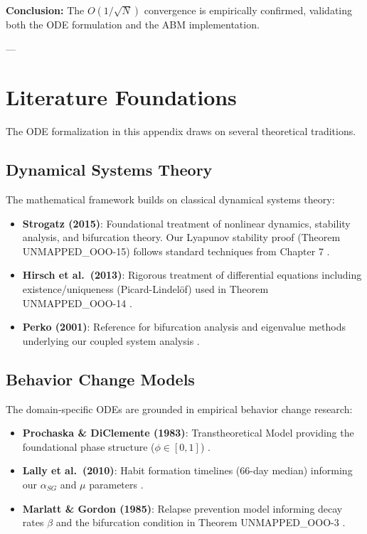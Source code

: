 \textbf{Conclusion:} The $O(1/\sqrt{N})$ convergence is empirically confirmed,
validating both the ODE formulation and the ABM implementation.

---


\section{Literature Foundations}
\label{ooo:literature}

The ODE formalization in this appendix draws on several theoretical traditions.

\subsection{Dynamical Systems Theory}

The mathematical framework builds on classical dynamical systems theory:

\begin{itemize}
\item \textbf{Strogatz (2015)}: Foundational treatment of nonlinear dynamics, stability analysis,
      and bifurcation theory. Our Lyapunov stability proof (Theorem UNMAPPED_OOO-15) follows standard
      techniques from Chapter 7 \citep{strogatz2015nonlinear}.

\item \textbf{Hirsch et al.~(2013)}: Rigorous treatment of differential equations including
      existence/uniqueness (Picard-Lindelöf) used in Theorem UNMAPPED_OOO-14 \citep{hirsch2013differential}.

\item \textbf{Perko (2001)}: Reference for bifurcation analysis and eigenvalue methods
      underlying our coupled system analysis \citep{perko2001differential}.
\end{itemize}

\subsection{Behavior Change Models}

The domain-specific ODEs are grounded in empirical behavior change research:

\begin{itemize}
\item \textbf{Prochaska \& DiClemente (1983)}: Transtheoretical Model providing the
      foundational phase structure ($\phi \in [0,1]$) \citep{prochaska1983stages}.

\item \textbf{Lally et al.~(2010)}: Habit formation timelines (66-day median) informing
      our $\alpha_{SG}$ and $\mu$ parameters \citep{lally2010habits}.

\item \textbf{Marlatt \& Gordon (1985)}: Relapse prevention model informing decay rates
      $\beta$ and the bifurcation condition in Theorem UNMAPPED_OOO-3 \citep{marlatt1985relapse}.
\end{itemize}

